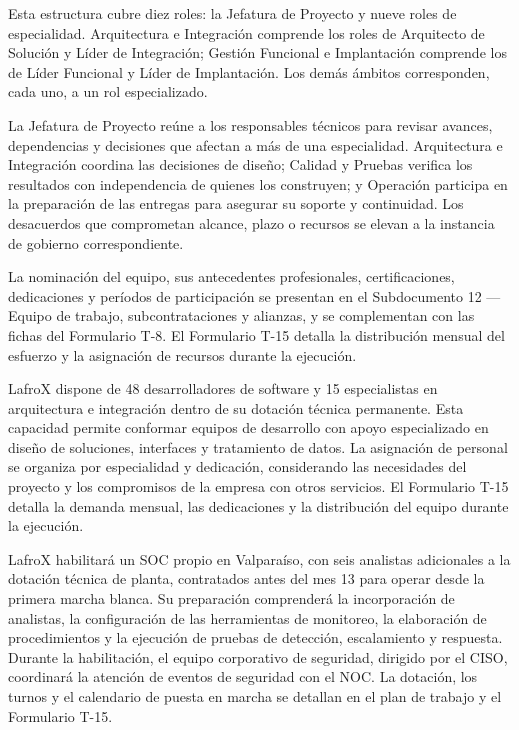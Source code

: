 Esta estructura cubre diez roles: la Jefatura de Proyecto y nueve roles de especialidad. Arquitectura e Integración comprende los roles de Arquitecto de Solución y Líder de Integración; Gestión Funcional e Implantación comprende los de Líder Funcional y Líder de Implantación. Los demás ámbitos corresponden, cada uno, a un rol especializado.

La Jefatura de Proyecto reúne a los responsables técnicos para revisar avances, dependencias y decisiones que afectan a más de una especialidad. Arquitectura e Integración coordina las decisiones de diseño; Calidad y Pruebas verifica los resultados con independencia de quienes los construyen; y Operación participa en la preparación de las entregas para asegurar su soporte y continuidad. Los desacuerdos que comprometan alcance, plazo o recursos se elevan a la instancia de gobierno correspondiente.

La nominación del equipo, sus antecedentes profesionales, certificaciones, dedicaciones y períodos de participación se presentan en el Subdocumento 12 --- Equipo de trabajo, subcontrataciones y alianzas, y se complementan con las fichas del Formulario T-8. El Formulario T-15 detalla la distribución mensual del esfuerzo y la asignación de recursos durante la ejecución.

LafroX dispone de 48 desarrolladores de software y 15 especialistas en arquitectura e integración dentro de su dotación técnica permanente. Esta capacidad permite conformar equipos de desarrollo con apoyo especializado en diseño de soluciones, interfaces y tratamiento de datos. La asignación de personal se organiza por especialidad y dedicación, considerando las necesidades del proyecto y los compromisos de la empresa con otros servicios. El Formulario T-15 detalla la demanda mensual, las dedicaciones y la distribución del equipo durante la ejecución.

LafroX habilitará un SOC propio en Valparaíso, con seis analistas adicionales a la dotación técnica de planta, contratados antes del mes 13 para operar desde la primera marcha blanca. Su preparación comprenderá la incorporación de analistas, la configuración de las herramientas de monitoreo, la elaboración de procedimientos y la ejecución de pruebas de detección, escalamiento y respuesta. Durante la habilitación, el equipo corporativo de seguridad, dirigido por el CISO, coordinará la atención de eventos de seguridad con el NOC. La dotación, los turnos y el calendario de puesta en marcha se detallan en el plan de trabajo y el Formulario T-15.

